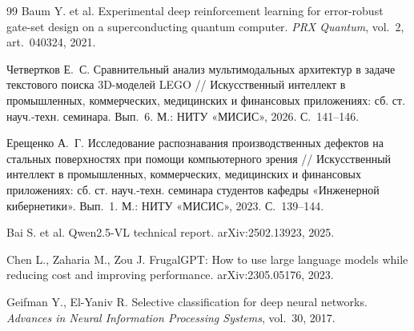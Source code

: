 \documentclass{misisarticle}
\begin{document}
\begin{thebibliography}{99}
 Baum Y. et al. Experimental deep reinforcement learning for error-robust gate-set design on a superconducting quantum computer. \textit{PRX Quantum}, vol.~2, art.~040324, 2021.

 Четвертков Е.~С. Сравнительный анализ мультимодальных архитектур в задаче текстового поиска 3D-моделей LEGO // Искусственный интеллект в промышленных, коммерческих, медицинских и финансовых приложениях: сб. ст. науч.-техн. семинара. Вып.~6. М.: НИТУ «МИСИС», 2026. С.~141--146.

 Ерещенко А.~Г. Исследование распознавания производственных дефектов на стальных поверхностях при помощи компьютерного зрения // Искусственный интеллект в промышленных, коммерческих, медицинских и финансовых приложениях: сб. ст. науч.-техн. семинара студентов кафедры «Инженерной кибернетики». Вып.~1. М.: НИТУ «МИСИС», 2023. С.~139--144.

 Bai S. et al. Qwen2.5-VL technical report. arXiv:2502.13923, 2025.

 Chen L., Zaharia M., Zou J. FrugalGPT: How to use large language models while reducing cost and improving performance. arXiv:2305.05176, 2023.

 Geifman Y., El-Yaniv R. Selective classification for deep neural networks. \textit{Advances in Neural Information Processing Systems}, vol.~30, 2017.

\end{thebibliography}
\end{document}
